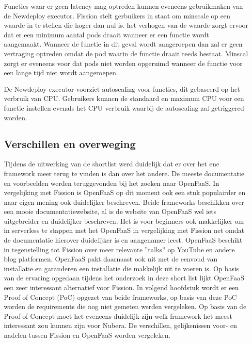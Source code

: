\begin{description}[style=unboxed, labelwidth=\linewidth, listparindent =0pt]
    Functies waar er geen latency mag optreden kunnen eveneens gebruikmaken van de Newdeploy executor. Fission stelt gerbuikers in staat om minscale op een waarde in te stellen die hoger dan nul is. het verhogen van de waarde zorgt ervoor dat er een minimum aantal pods draait wanneer er een functie wordt aangemaakt. Wanneer de functie in dit geval wordt aangeroepen dan zal er geen vertraging optreden omdat de pod waarin de functie draait reeds bestaat. Minscal zorgt er eveneens voor dat pods niet worden opgeruimd wanneer de functie voor een lange tijd niet wordt aangeroepen.
    \autocite{Fission2019}
    \newline
    
    \item[Autoscaling]
    De Newdeploy executor voorziet autoscaling voor functies, dit gebaseerd op het verbruik van CPU. Gebruikers kunnen de standaard en maximum CPU voor een functie instellen evenals het CPU verbruik waarbij de autoscaling zal getriggered worden. \autocite{Fission2019}
    \newline
\end{description}

\subsection{Verschillen en overweging}
Tijdens de uitwerking van de shortlist werd duidelijk dat er over het ene framework meer terug te vinden is dan over het andere. De meeste documentatie en voorbeelden werden teruggevonden bij het zoeken naar OpenFaaS. In vergelijking met Fission is OpenFaaS op dit moment ook een stuk populairder en naar eigen mening ook duidelijker beschreven. Beide frameworks beschikken over een mooie documentatiewebsite, al is de website van OpenFaaS wel iets uitgebreider en duidelijker beschreven. Het is voor beginners ook makkelijker om in serverless te stappen met het OpenFaaS in vergelijking met Fission net omdat de documentatie hierover duidelijker is en aangenamer leest. OpenFaaS beschikt in tegenstelling  tot Fission over meer relevante ''talks'' op YouTube en andere blog platformen. OpenFaaS pakt daarnaast ook uit met de eenvoud van installatie en garanderen een installatie die makkelijk uit te voeren is. Op basis van de ervaring opgedaan tijdens het onderzoek in deze short list lijkt OpenFaaS een zeer interessant alternatief voor Fission. In volgend hoofdstuk wordt er een Proof of Concept (PoC) opgezet van beide frameworks, op basis van deze PoC worden de requirements die nog niet gemeten werden vergeleken. Op basis van de Proof of Concept moet het eveneens duidelijk zijn welk framework het meest interessant zou kunnen zijn voor Nubera. De verschillen, gelijkenissen voor- en nadelen tussen Fission en OpenFaaS worden vergeleken. 
